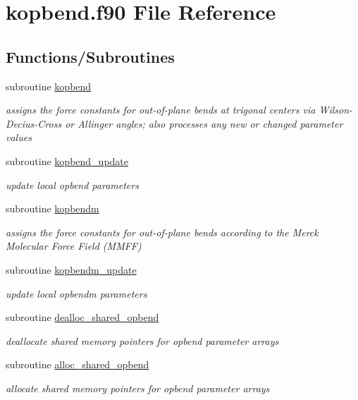 \hypertarget{kopbend_8f90}{\section{kopbend.\-f90 File Reference}
\label{kopbend_8f90}
}
\subsection*{Functions/\-Subroutines}
\begin{DoxyCompactItemize}
\item 
subroutine \hyperlink{kopbend_8f90_a0dcf36f40311e091ebd6983475b2330d}{kopbend}
\begin{DoxyCompactList}\small\item\em assigns the force constants for out-\/of-\/plane bends at trigonal centers via Wilson-\/\-Decius-\/\-Cross or Allinger angles; also processes any new or changed parameter values \end{DoxyCompactList}\item 
subroutine \hyperlink{kopbend_8f90_a08ea37d5a4ce33ee9ffe59669c57e2df}{kopbend\-\_\-update}
\begin{DoxyCompactList}\small\item\em update local opbend parameters \end{DoxyCompactList}\item 
subroutine \hyperlink{kopbend_8f90_a41069e0febae2b090184a573fc16388b}{kopbendm}
\begin{DoxyCompactList}\small\item\em assigns the force constants for out-\/of-\/plane bends according to the Merck Molecular Force Field (M\-M\-F\-F) \end{DoxyCompactList}\item 
subroutine \hyperlink{kopbend_8f90_afa93cf521dcd85cfd7629adbe31ef9f9}{kopbendm\-\_\-update}
\begin{DoxyCompactList}\small\item\em update local opbendm parameters \end{DoxyCompactList}\item 
subroutine \hyperlink{kopbend_8f90_aaecffff0d28e7deed42f72bc5515d6f1}{dealloc\-\_\-shared\-\_\-opbend}
\begin{DoxyCompactList}\small\item\em deallocate shared memory pointers for opbend parameter arrays \end{DoxyCompactList}\item 
subroutine \hyperlink{kopbend_8f90_a370476ecaaa69aeec0cce91e5cf208e2}{alloc\-\_\-shared\-\_\-opbend}
\begin{DoxyCompactList}\small\item\em allocate shared memory pointers for opbend parameter arrays \end{DoxyCompactList}\end{DoxyCompactItemize}


